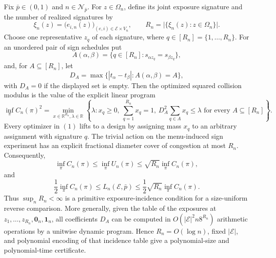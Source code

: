 Fix \(\bar p\in(0,1)\) and \(n\in\mathcal N_{\bar p}\). For \(z\in\Omega_n\), define its joint exposure signature and the number of realized signatures by
\[
 \xi_n(z)=\bigl(e_{i,n}(z)\bigr)_{(e,i)\in\mathcal E\times V_n},
 \qquad
 R_n=\bigl|\{\xi_n(z):z\in\Omega_n\}\bigr|.
\]
Choose one representative \(z_q\) of each signature, where \(q\in[R_n]=\{1,\ldots,R_n\}\). For an unordered pair of sign schedules put
\[
 A(\alpha,\beta)=\{q\in[R_n]:s_{\alpha z_q}=s_{\beta z_q}\},
\]
and, for \(A\subseteq[R_n]\), let
\[
 D_A=\max\{|t_\alpha-t_\beta|:A(\alpha,\beta)=A\},
\]
with \(D_A=0\) if the displayed set is empty. Then the optimized squared collision modulus is the value of the explicit linear program
\[
 \inf_\pi C_n(\pi)^2
 =\min_{x\in\mathbb R^{R_n},\lambda\in\mathbb R}
 \left\{\lambda:
 x_q\ge0,\ \sum_{q=1}^{R_n}x_q=1,\
 D_A^2\sum_{q\in A}x_q\le\lambda
 \text{ for every }A\subseteq[R_n]\right\}. \tag{1}
\]
Every optimizer in \((1)\) lifts to a design by assigning mass \(x_q\) to an arbitrary assignment with signature \(q\). The trivial action on the menu-induced sign experiment has an explicit fractional diameter cover of congestion at most \(R_n\). Consequently,
\[
 \inf_\pi C_n(\pi)
 \le \inf_\pi U_n(\pi)
 \le \sqrt{R_n}\inf_\pi C_n(\pi), \tag{2}
\]
and
\[
 \frac12\inf_\pi C_n(\pi)
 \le L_n(\mathcal E,\bar p)
 \le\frac12\sqrt{R_n}\inf_\pi C_n(\pi). \tag{3}
\]
Thus \(\sup_nR_n<\infty\) is a primitive exposure-incidence condition for a size-uniform reverse comparison. More generally, given the table of the exposures at \(z_1,\ldots,z_{R_n},\mathbf 0_n,\mathbf 1_n\), all coefficients \(D_A\) can be computed in \(O(|\mathcal E|^2n8^{R_n})\) arithmetic operations by a unitwise dynamic program. Hence \(R_n=O(\log n)\), fixed \(|\mathcal E|\), and polynomial encoding of that incidence table give a polynomial-size and polynomial-time certificate.